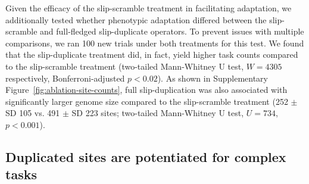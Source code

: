 Given the efficacy of the slip-scramble treatment in facilitating adaptation, we additionally tested whether phenotypic adaptation differed between the slip-scramble and full-fledged slip-duplicate operators.
To prevent issues with multiple comparisons, we ran 100 new trials under both treatments for this test.
We found that the slip-duplicate treatment did, in fact, yield higher task counts compared to the slip-scramble treatment (two-tailed Mann-Whitney U test, $W = 4305$ respectively, Bonferroni-adjusted $p < 0.02$).
As shown in Supplementary Figure~\ref{fig:ablation-site-counts}, full slip-duplication was also associated with significantly larger genome size compared to the slip-scramble treatment (252 $\pm$ SD 105 vs. 491 $\pm$ SD 223 sites; two-tailed Mann-Whitney U test, $U = 734$, $p < 0.001$).






\subsection{Duplicated sites are potentiated for complex tasks}

